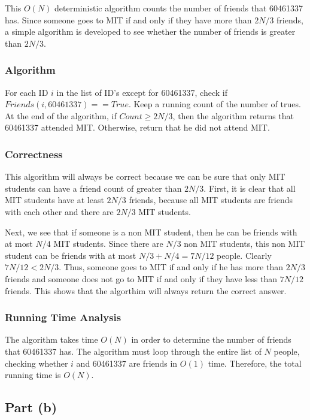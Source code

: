 \documentclass{6046}
\begin{document}
This $O(N)$ deterministic algorithm counts the number of friends that 60461337 has. Since someone goes to MIT if and only if they have more than $2N/3$ friends, a simple algorithm is developed to see whether the number of friends is greater than $2N/3$. 

\subsubsection*{Algorithm}

For each ID $i$ in the list of ID's except for 60461337, check if $Friends(i, 60461337) == True$. Keep a running count of the number of trues. At the end of the algorithm, if $Count \geq 2N/3$, then the algorithm returns that 60461337 attended MIT. Otherwise, return that he did not attend MIT. 

\subsubsection*{Correctness}

This algorithm will always be correct because we can be sure that only MIT students can have a friend count of greater than $2N/3$. First, it is clear that all MIT students have at least $2N/3$ friends, because all MIT students are friends with each other and there are $2N/3$ MIT students.

Next, we see that if someone is a non MIT student, then he can be friends with at most $N/4$ MIT students. Since there are $N/3$ non MIT students, this non MIT student can be friends with at most $N/3 + N/4 = 7N/12$ people. Clearly $7N/12 < 2N/3$. Thus, someone goes to MIT if and only if he has more than $2N/3$ friends and someone does not go to MIT if and only if they have less than $7N/12$ friends. This shows that the algorthim will always return the correct answer. 

\subsubsection*{Running Time Analysis}

The algorithm takes time $O(N)$ in order to determine the number of friends that 60461337 has. The algorithm must loop through the entire list of $N$ people, checking whether $i$ and 60461337 are friends in $O(1)$ time. Therefore, the total running time is $O(N)$. 

\subsection*{Part (b)}
\end{document}
